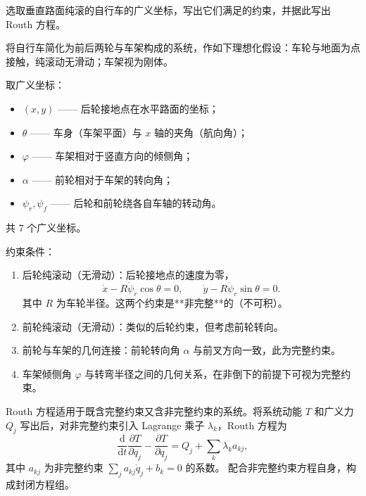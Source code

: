\begin{question}
选取垂直路面纯滚的自行车的广义坐标，写出它们满足的约束，并据此写出 Routh 方程。
\begin{solution}
将自行车简化为前后两轮与车架构成的系统，作如下理想化假设：车轮与地面为点接触，纯滚动无滑动；车架视为刚体。

取广义坐标：
\begin{itemize}
  \item \((x,y)\) —— 后轮接地点在水平路面的坐标；
  \item \(\theta\) —— 车身（车架平面）与 \(x\) 轴的夹角（航向角）；
  \item \(\varphi\) —— 车架相对于竖直方向的倾侧角；
  \item \(\alpha\) —— 前轮相对于车架的转向角；
  \item \(\psi_r,\psi_f\) —— 后轮和前轮绕各自车轴的转动角。
\end{itemize}
共 7 个广义坐标。

约束条件：
\begin{enumerate}
  \item 后轮纯滚动（无滑动）：后轮接地点的速度为零，
  \[
  \dot x - R\dot\psi_r\cos\theta = 0,\qquad
  \dot y - R\dot\psi_r\sin\theta = 0 .
  \]
  其中 \(R\) 为车轮半径。这两个约束是**非完整**的（不可积）。
  \item 前轮纯滚动（无滑动）：类似的后轮约束，但考虑前轮转向。
  \item 前轮与车架的几何连接：前轮转向角 \(\alpha\) 与前叉方向一致，此为完整约束。
  \item 车架倾侧角 \(\varphi\) 与转弯半径之间的几何关系，在非倒下的前提下可视为完整约束。
\end{enumerate}

Routh 方程适用于既含完整约束又含非完整约束的系统。将系统动能 \(T\) 和广义力 \(Q_j\) 写出后，对非完整约束引入 Lagrange 乘子 \(\lambda_k\)，Routh 方程为
\[
\frac{\mathrm d}{\mathrm d t}\frac{\partial T}{\partial\dot q_j}
- \frac{\partial T}{\partial q_j}
= Q_j + \sum_k \lambda_k a_{kj},
\]
其中 \(a_{kj}\) 为非完整约束 \(\sum_j a_{kj}\dot q_j + b_k = 0\) 的系数。
配合非完整约束方程自身，构成封闭方程组。
\end{solution}
\end{question}

